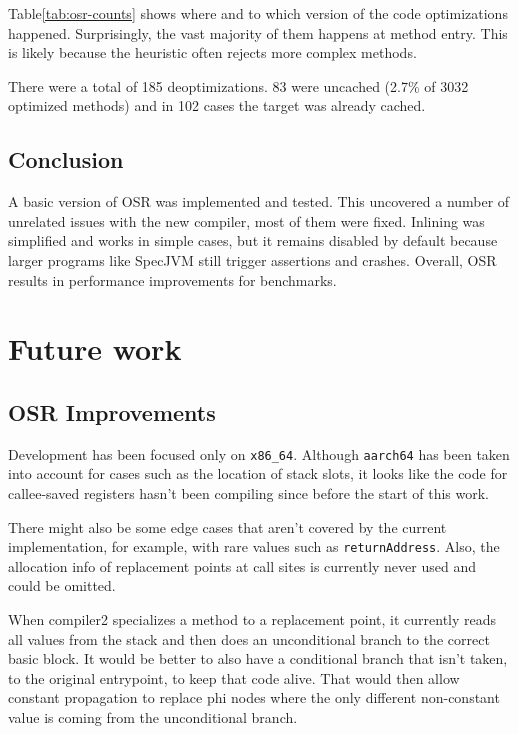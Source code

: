 \documentclass[draft,final]{vutinfth} %
\begin{document}
    Table\ref{tab:osr-counts} shows where and to which version of the code optimizations happened.
    Surprisingly, the vast majority of them happens at method entry.
    This is likely because the heuristic often rejects more complex methods.

    There were a total of 185 deoptimizations.
    83 were uncached (2.7\% of 3032 optimized methods)
    and in 102 cases the target was already cached.


    \section{Conclusion}

    A basic version of OSR was implemented and tested.
    This uncovered a number of unrelated issues with the new compiler, most of them were fixed.
    Inlining was simplified and works in simple cases,
    but it remains disabled by default
    because larger programs like SpecJVM still trigger assertions and crashes.
    Overall, OSR results in performance improvements for benchmarks.


    \chapter{Future work}


    \section{OSR Improvements}

    Development has been focused only on \texttt{x86\_64}.
    Although \texttt{aarch64} has been taken into account for cases
    such as the location of stack slots,
    it looks like the code for callee-saved registers
    hasn't been compiling since before the start of this work.

    There might also be some edge cases that aren't covered by the current implementation,
    for example, with rare values such as \lstinline{returnAddress}.
    Also, the allocation info of replacement points at call sites is currently never used
    and could be omitted.

    When compiler2 specializes a method to a replacement point,
    it currently reads all values from the stack
    and then does an unconditional branch to the correct basic block.
    It would be better to also have a conditional branch that isn't taken,
    to the original entrypoint,
    to keep that code alive.
    That would then allow constant propagation to replace phi nodes where
    the only different non-constant value is coming from the unconditional branch.
\end{document}
